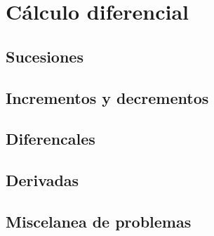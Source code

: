 \chapter{Cálculo diferencial}
\section{Sucesiones}
\section{Incrementos y decrementos}
\section{Diferencales}
\section{Derivadas}
\section{Miscelanea de problemas}